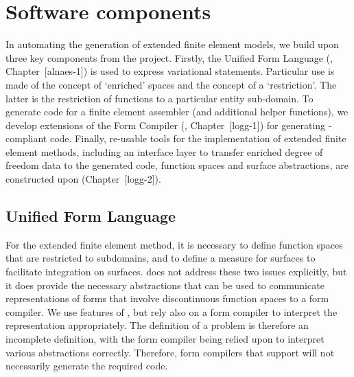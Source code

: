 \section{Software components}

In automating the generation of extended finite element models, we build
upon three key components from the \fenics{} project. Firstly, the Unified
Form Language (\ufl{}, Chapter~[alnaes-1]) is used to express variational
statements. Particular use is made of the concept of `enriched' spaces
and the \ufl{} concept of a `restriction'. The latter is the restriction
of functions to a particular entity sub-domain.  To generate code for a
finite element assembler (and additional helper functions), we develop
extensions of the \fenics{} Form Compiler (\ffc{}, Chapter~[logg-1])
for generating \ufc{}-compliant code. Finally, re-usable tools for the
implementation of extended finite element methods, including an interface
layer to transfer enriched degree of freedom data to the generated code,
function spaces and surface abstractions, are constructed upon \dolfin{}
(Chapter~[logg-2]).
\subsection{Unified Form Language}

For the extended finite element method, it is necessary to define
function spaces that are restricted to subdomains, and to define a
measure for surfaces to facilitate integration on surfaces.  \ufl{}
does not address these two issues explicitly, but it does provide the
necessary abstractions that can be used to communicate representations of
forms that involve discontinuous function spaces to a form compiler. We
use features of \ufl{}, but rely also on a form compiler to interpret
the \ufl{} representation appropriately.  The \ufl{} definition of a
problem is therefore an incomplete definition, with the form compiler
being relied upon to interpret various abstractions correctly. Therefore,
form compilers that support \ufl{} will not necessarily generate the
required code.

